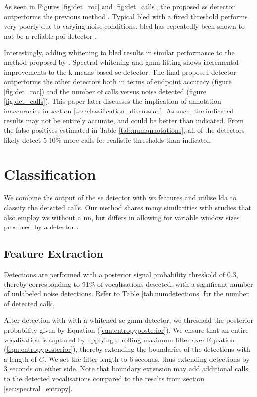 {As seen in Figures \ref{fig:det_roc} and \ref{fig:det_calls}, the proposed \ac{se} detector outperforms the previous method \citep{mypaper}. Typical \ac{bled} with a fixed threshold performs very poorly due to varying noise conditions. \ac{bled} has repeatedly been shown to not be a reliable \ac{poi} detector \citep{internalsignaldetection, entropyJASA}. 

Interestingly, adding whitening to \ac{bled} results in similar performance to the method proposed by \citet{mypaper}. Spectral whitening and \ac{gmm} fitting shows incremental improvements to the k-means based \ac{se} detector. The final proposed detector outperforms the other detectors both in terms of endpoint accuracy (figure \ref{fig:det_roc}) and the number of calls versus noise detected (figure \ref{fig:det_calls}). This paper later discusses the implication of annotation inaccuracies in section \ref{sec:classification_discussion}. As such, the indicated results may not be entirely accurate, and could be better than indicated. From the false positives estimated in Table \ref{tab:numannotations}, all of the detectors likely detect 5-10\% more calls for realistic thresholds than indicated.


\section{Classification}
\label{sec:cls}
We combine the output of the \ac{se} detector with \ac{ws} features and utilise \ac{lda} to classify the detected calls. Our method shares many similarities with studies that also employ \ac{ws} without a \ac{nn}, but differs in allowing for variable window sizes produced by a detector \citep{ws_audio, ws_ecg}.

\subsection{Feature Extraction}
Detections are performed with a posterior signal probability threshold of 0.3, thereby corresponding to 91\% of vocalisations detected, with a significant number of unlabeled noise detections. Refer to Table \ref{tab:numdetections} for the number of detected calls. 

After detection with with a whitened \ac{se} \ac{gmm} detector, we threshold the posterior probability given by Equation (\ref{eqn:entropyposterior}). We ensure that an entire vocalisation is captured by applying a rolling maximum filter over Equation (\ref{eqn:entropyposterior}), thereby extending the boundaries of the detections with a length of $G$. We set the filter length to 6 seconds, thus extending detections by 3 seconds on either side. Note that boundary extension may add additional calls to the detected vocalisations compared to the results from section \ref{sec:spectral_entropy}.

}

